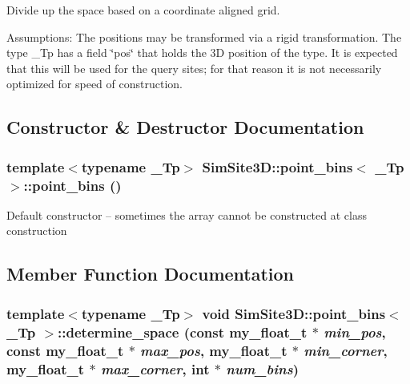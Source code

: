 Divide up the space based on a coordinate aligned grid. 

Assumptions: The positions may be transformed via a rigid transformation. The type \_\-Tp has a field \char`\"{}pos\char`\"{} that holds the 3D position of the type. It is expected that this will be used for the query sites; for that reason it is not necessarily optimized for speed of construction. 



\subsection{Constructor \& Destructor Documentation}
\subsubsection{\setlength{\rightskip}{0pt plus 5cm}template$<$typename \_\-Tp$>$ \bf{SimSite3D::point\_\-bins}$<$ \_\-Tp $>$::\bf{point\_\-bins} ()\hspace{0.3cm}{\tt  [inline]}}\label{classSimSite3D_1_1point__bins_3e8b2c7e86f5ee787cc71f32cc8619da}


Default constructor -- sometimes the array cannot be constructed at class construction 

\subsection{Member Function Documentation}
\subsubsection{\setlength{\rightskip}{0pt plus 5cm}template$<$typename \_\-Tp$>$ void \bf{SimSite3D::point\_\-bins}$<$ \_\-Tp $>$::determine\_\-space (const my\_\-float\_\-t $\ast$ {\em min\_\-pos}, const my\_\-float\_\-t $\ast$ {\em max\_\-pos}, my\_\-float\_\-t $\ast$ {\em min\_\-corner}, my\_\-float\_\-t $\ast$ {\em max\_\-corner}, int $\ast$ {\em num\_\-bins})\hspace{0.3cm}{\tt  [inline]}}\label{classSimSite3D_1_1point__bins_d0e79de47eb796a1d310e8ecf3edf3b5}


